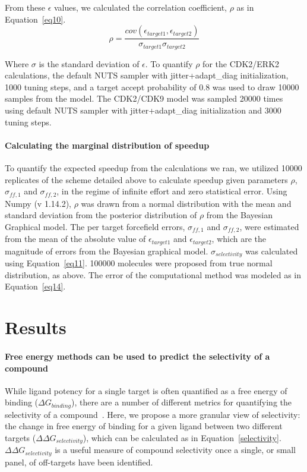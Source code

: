 \documentclass[9pt,lineno]{elife-modified} %
\begin{document}
From these $\epsilon$ values, we calculated the correlation coefficient, $\rho$ as in Equation~\ref{eq10}. 
\begin{equation}\label{eq10}
\rho = \frac{cov(\epsilon_{target1}, \epsilon_{target2})}{\sigma_{target 1}\sigma_{target 2}}
\end{equation}
 
 Where $\sigma$ is the standard deviation of $\epsilon$. To quantify $\rho$ for the CDK2/ERK2 calculations, the default NUTS sampler with jitter+adapt\_diag initialization, 1000 tuning steps, and a target accept probability of 0.8 was used to draw 10000 samples from the model. The CDK2/CDK9 model was sampled 20000 times using default NUTS sampler with jitter+adapt\_diag initialization and 3000 tuning steps. 
 
 \paragraph{Calculating the marginal distribution of speedup}
 
 To quantify the expected speedup from the calculations we ran, we utilized 10000 replicates of the scheme detailed above to calculate speedup given parameters $\rho$, $\sigma_{ff,1}$ and $\sigma_{ff,2}$, in the regime of infinite effort and zero statistical error. Using Numpy (v 1.14.2), $\rho$ was drawn from a normal distribution with the mean and standard deviation from the posterior distribution of $\rho$ from the Bayesian Graphical model. The per target forcefield errors, $\sigma_{ff,1}$ and $\sigma_{ff,2}$, were estimated from the mean of the absolute value of  $\epsilon_{target1}$ and $\epsilon_{target2}$, which are the magnitude of errors from the Bayesian graphical model. $\sigma_{selectivity}$ was calculated using Equation~\ref{eq11}. 100000 molecules were proposed from true normal distribution, as above. The error of the computational method was modeled as in Equation~\ref{eq14}. 
 
%
%
%

\section{Results}
\paragraph{Free energy methods can be used to predict the selectivity of a compound}
While ligand potency for a single target is often quantified as a free energy of binding ($\Delta G_{binding}$), there are a number of different metrics for quantifying the selectivity of a compound~\citep{Bosc:2017gs,Cheng2010-ip}. Here, we propose a more granular view of selectivity: the change in free energy of binding for a given ligand between two different targets ($\Delta \Delta G_{selectivity}$), which can be calculated as in Equation~\ref{selectivity}. $\Delta \Delta G_{selectivity}$ is a useful measure of compound selectivity once a single, or small panel, of off-targets have been identified. 
\end{document}
